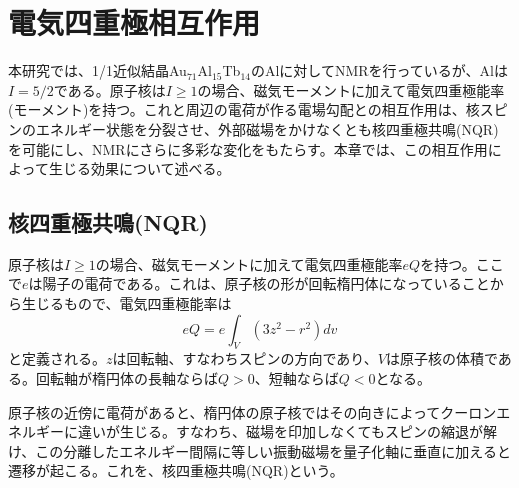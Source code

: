 \documentclass[11pt,a4j]{jreport}
\begin{document}
\chapter{電気四重極相互作用}
本研究では、1/1近似結晶Au$_{71}$Al$_{15}$Tb$_{14}$のAlに対してNMRを行っているが、Alは$I=5/2$である。原子核は$I \geq 1$の場合、磁気モーメントに加えて電気四重極能率(モーメント)を持つ。これと周辺の電荷が作る電場勾配との相互作用は、核スピンのエネルギー状態を分裂させ、外部磁場をかけなくとも核四重極共鳴(NQR)を可能にし、NMRにさらに多彩な変化をもたらす。本章では、この相互作用によって生じる効果について述べる。

\section{核四重極共鳴(NQR)}
原子核は$I \geq 1$の場合、磁気モーメントに加えて電気四重極能率$eQ$を持つ。ここで$e$は陽子の電荷である。これは、原子核の形が回転楕円体になっていることから生じるもので、電気四重極能率は
\begin{equation}
  eQ = e \int_V (3z^2 - r^2) dv
\end{equation}
と定義される。$z$は回転軸、すなわちスピンの方向であり、$V$は原子核の体積である。回転軸が楕円体の長軸ならば$Q > 0$、短軸ならば$Q < 0$となる。

原子核の近傍に電荷があると、楕円体の原子核ではその向きによってクーロンエネルギーに違いが生じる。すなわち、磁場を印加しなくてもスピンの縮退が解け、この分離したエネルギー間隔に等しい振動磁場を量子化軸に垂直に加えると遷移が起こる。これを、核四重極共鳴(NQR)という。
\end{document}
